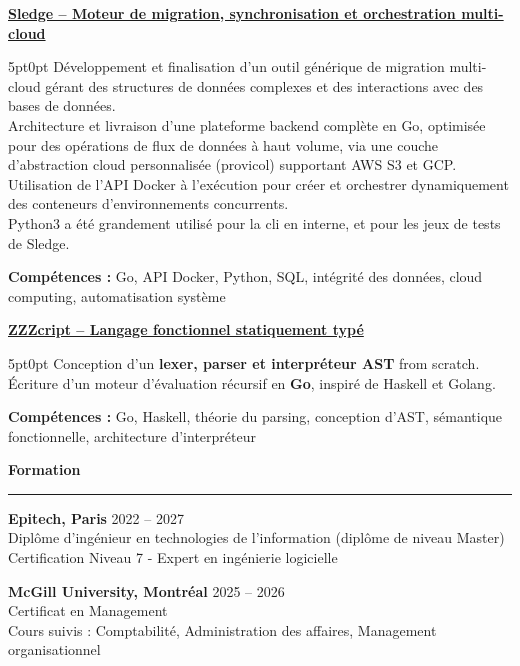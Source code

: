 \documentclass[9pt]{extarticle}
\begin{document}
\par\vspace{8pt}

\underline{\bfseries Sledge -- Moteur de migration, synchronisation et orchestration multi-cloud}
\par
\begin{adjustwidth}{5pt}{0pt}
    Développement et finalisation d'un outil générique de migration multi-cloud gérant des structures de données complexes et des interactions avec des bases de données. \\
    Architecture et livraison d'une plateforme backend complète en Go, optimisée pour des opérations de flux de données à haut volume, via une couche d'abstraction cloud personnalisée ({\ttfamily provicol}) supportant AWS S3 et GCP. \\
    Utilisation de l'API Docker à l'exécution pour créer et orchestrer dynamiquement des conteneurs d'environnements concurrents. \\
    Python3 a été grandement utilisé pour la cli en interne, et pour les jeux de tests de Sledge.
\end{adjustwidth}
\par
{\bfseries Compétences :} Go, API Docker, Python, SQL, intégrité des données, cloud computing, automatisation système

\par\vspace{8pt}

\underline{\bfseries \href{https://github.com/paulogarithm/zzzcript}{ZZZcript} -- Langage fonctionnel statiquement typé}
\par
\begin{adjustwidth}{5pt}{0pt}
	Conception d'un {\bfseries lexer, parser et interpréteur AST} from scratch. \\
	Écriture d'un moteur d'évaluation récursif en {\bfseries Go}, inspiré de Haskell et Golang.
\end{adjustwidth}
\par
{\bfseries Compétences :} Go, Haskell, théorie du parsing, conception d'AST, sémantique fonctionnelle, architecture d'interpréteur

\par\vspace{8pt}


{\large\bfseries Formation}
\par\vspace{-8pt}
\rule{\linewidth}{0.4pt}
\par\vspace{5pt}

{\bfseries Epitech, Paris} \hfill 2022 -- 2027 \\
Diplôme d'ingénieur en technologies de l'information (diplôme de niveau Master) \\
Certification Niveau 7 - Expert en ingénierie logicielle

\vspace{6pt}

{\bfseries McGill University, Montréal} \hfill 2025 -- 2026 \\
Certificat en Management \\
Cours suivis : Comptabilité, Administration des affaires, Management organisationnel
\end{document}

